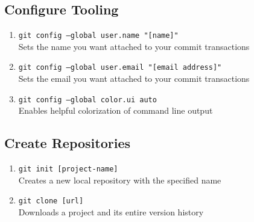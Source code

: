 \documentclass[a4paper, twoside, 11pt]{extarticle}
\newenvironment{enumx} {
    \begin{enumerate}[leftmargin=*]
    \setlength{\topsep}{0pt}
    \setlength{\itemsep}{0pt}
    \setlength{\parskip}{0pt}
    \setlength{\parsep}{0pt}
    }
{\end{enumerate}}
\begin{document}
\renewcommand{\footrulewidth}{0.4pt}

\begin{multicols}{3}
\subsection{Configure Tooling}
\begin{enumx}
    \item \texttt{git config --global user.name "[name]"}\\
    Sets the name you want attached to your commit transactions
    \item \texttt{git config --global user.email "[email address]"}\\
    Sets the email you want attached to your commit transactions
    \item \texttt{git config --global color.ui auto}\\
    Enables helpful colorization of command line output
\end{enumx}

\subsection{Create Repositories}
\begin{enumx}
    \item \texttt{git init [project-name]}\\
    Creates a new local repository with the specified name
    \item \texttt{git clone [url]}\\
    Downloads a project and its entire version history
\end{enumx}


\end{multicols}
\end{document}
